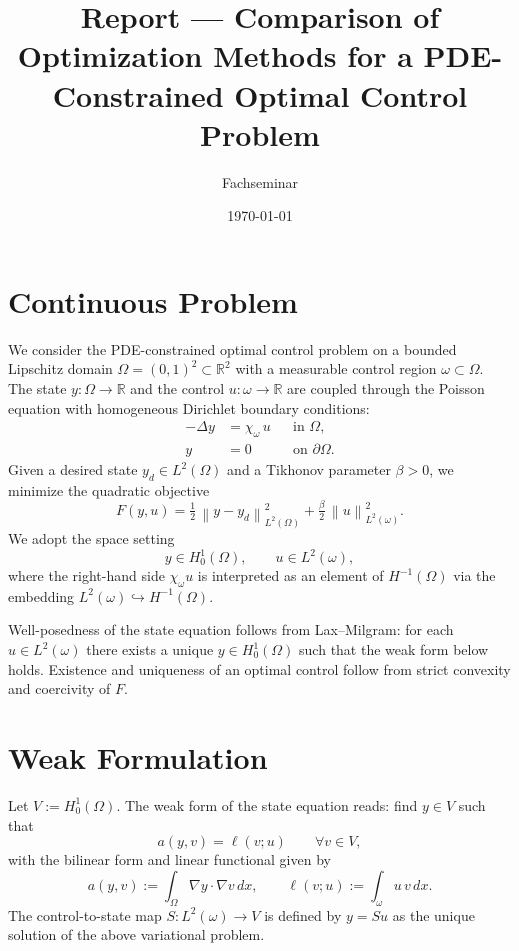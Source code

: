 \documentclass[11pt,a4paper]{article}
\title{Report — Comparison of Optimization Methods for a PDE-Constrained Optimal Control Problem}
\author{Fachseminar}
\date{\today}
\newcommand{\R}{\mathbb{R}}
\newcommand{\Om}{\Omega}
\newcommand{\om}{\omega}
\newcommand{\normOm}[1]{\left\| #1 \right\|_{L^2(\Omega)}}
\newcommand{\normom}[1]{\left\| #1 \right\|_{L^2(\omega)}}
\newcommand{\Chi}{\chi}
\begin{document}
\maketitle
\tableofcontents

\section{Continuous Problem}
We consider the PDE-constrained optimal control problem on a bounded Lipschitz domain $\Om = (0,1)^2 \subset \R^2$ with a measurable control region $\om \subset \Om$. The state $y\colon \Om \to \R$ and the control $u\colon \om \to \R$ are coupled through the Poisson equation with homogeneous Dirichlet boundary conditions:
\begin{align}
  -\Delta y &= \Chi_{\om} \, u &&\text{in } \Om, \\
  y &= 0 &&\text{on } \partial\Om.
\end{align}
Given a desired state $y_d\in L^2(\Om)$ and a Tikhonov parameter $\beta>0$, we minimize the quadratic objective
\begin{equation}
  F(y,u) = \tfrac12\, \normOm{y - y_d}^2 + \tfrac{\beta}{2}\, \normom{u}^2.
\end{equation}
We adopt the space setting
\begin{equation}
  y \in H_0^1(\Om), \qquad u \in L^2(\om),
\end{equation}
where the right-hand side $\Chi_{\om} u$ is interpreted as an element of $H^{-1}(\Om)$ via the embedding $L^2(\om)\hookrightarrow H^{-1}(\Om)$.

Well-posedness of the state equation follows from Lax–Milgram: for each $u\in L^2(\om)$ there exists a unique $y\in H_0^1(\Om)$ such that the weak form below holds. Existence and uniqueness of an optimal control follow from strict convexity and coercivity of $F$.

\section{Weak Formulation}
Let $V := H_0^1(\Om)$. The weak form of the state equation reads: find $y\in V$ such that
\begin{equation}
  a(y,v) = \ell(v;u) \qquad \forall v\in V,
\end{equation}
with the bilinear form and linear functional given by
\begin{equation}
  a(y,v) := \int_{\Om} \nabla y\cdot\nabla v\,dx, \qquad
  \ell(v;u) := \int_{\om} u\, v\,dx.
\end{equation}
The control-to-state map $S\colon L^2(\om)\to V$ is defined by $y = S u$ as the unique solution of the above variational problem.
\end{document}
